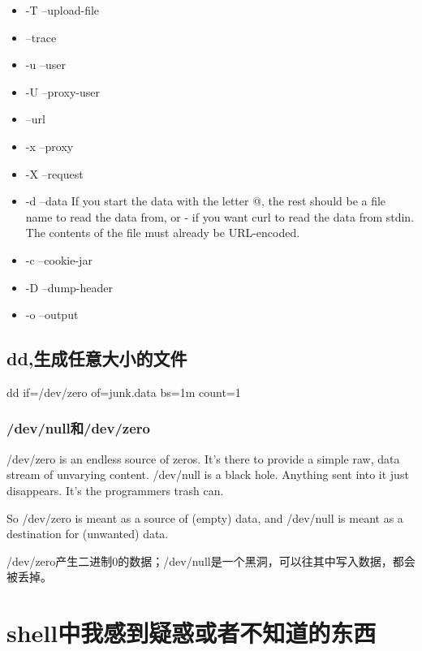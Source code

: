 \begin{itemize}
\item -T --upload-file

\item --trace

\item -u --user
\item -U --proxy-user

\item --url

\item -x --proxy

\item -X --request


\item -d --data
If  you  start  the data with the letter @, the rest should be a file name to read the data from, or - if you want curl  to  read the  data  from stdin.  The contents of the file must already be URL-encoded. 
\item -c --cookie-jar
\item -D --dump-header
\item -o --output

\end{itemize}

\subsection{dd,生成任意大小的文件}

\begin{Bash}

dd if=/dev/zero of=junk.data bs=1m count=1

\end{Bash}

\subsubsection{/dev/null和/dev/zero}

/dev/zero is an endless source of zeros. It's there to provide a simple raw, data stream of unvarying content. /dev/null is a black hole. Anything sent into it just disappears. It's the programmers trash can.

So /dev/zero is meant as a source of (empty) data, and /dev/null is meant as a destination for (unwanted) data.

/dev/zero产生二进制0的数据；/dev/null是一个黑洞，可以往其中写入数据，都会被丢掉。



\section{shell中我感到疑惑或者不知道的东西}


